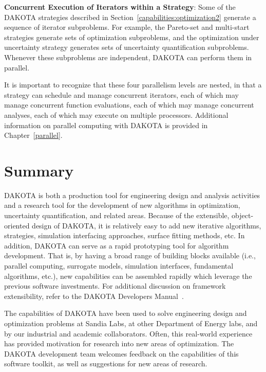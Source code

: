 \textbf{Concurrent Execution of Iterators within a Strategy}: Some of
the DAKOTA strategies described in
Section~\ref{capabilities:optimization2} generate a sequence of
iterator subproblems. For example, the Pareto-set and
multi-start strategies generate sets of optimization subproblems, and
the optimization under uncertainty strategy generates sets of
uncertainty quantification subproblems. Whenever these subproblems are
independent, DAKOTA can perform them in parallel.

It is important to recognize that these four parallelism levels are
nested, in that a strategy can schedule and manage concurrent
iterators, each of which may manage concurrent function evaluations,
each of which may manage concurrent analyses, each of which may
execute on multiple processors. Additional information on parallel
computing with DAKOTA is provided in Chapter~\ref{parallel}.

\section{Summary}\label{capabilities:summary}

DAKOTA is both a production tool for engineering design and analysis
activities and a research tool for the development of new algorithms
in optimization, uncertainty quantification, and related areas.
Because of the extensible, object-oriented design of DAKOTA, it is
relatively easy to add new iterative algorithms, strategies,
simulation interfacing approaches, surface fitting methods, etc. In
addition, DAKOTA can serve as a rapid prototyping tool for algorithm
development. That is, by having a broad range of building blocks
available (i.e., parallel computing, surrogate models, simulation
interfaces, fundamental algorithms, etc.), new capabilities can be
assembled rapidly which leverage the previous software investments.
For additional discussion on framework extensibility, refer to the
DAKOTA Developers Manual~\cite{DevMan}.

The capabilities of DAKOTA have been used to solve engineering design
and optimization problems at Sandia Labs, at other Department of
Energy labs, and by our industrial and academic collaborators. Often,
this real-world experience has provided motivation for research into
new areas of optimization. The DAKOTA development team welcomes
feedback on the capabilities of this software toolkit, as well as
suggestions for new areas of research.
